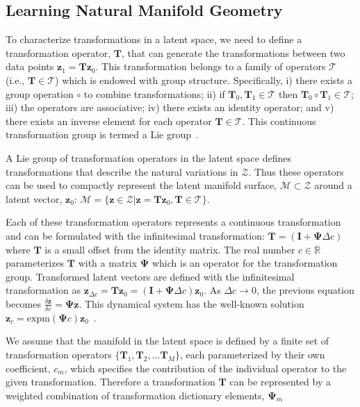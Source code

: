 \documentclass[letterpaper]{article} %
\newcommand{\mtx}[1]{\ensuremath{\mathbf{#1}}}
\newcommand{\vtr}[1]{\ensuremath{\mathbf{#1}}}
\begin{document}
\subsection{Learning Natural Manifold Geometry}\label{sec:lieOpt}
To characterize transformations in a latent space, we need to define a transformation operator, $\mtx{T}$, that can generate the transformations between two data points $\vtr{z}_1 = \mtx{T}\vtr{z}_0$. This transformation belongs to a family of operators $\mathcal{T}$ (i.e., $\mtx{T} \in \mathcal{T}$) which is endowed with group structure. Specifically, i) there exists a group operation $\circ$ to combine transformations; ii) if $\mtx{T}_0, \mtx{T}_1 \in \mathcal{T}$ then $\mtx{T}_0 \circ \mtx{T}_1 \in \mathcal{T}$; iii) the operators are associative; iv) there exists an identity operator; and v) there exists an inverse element for each operator $\mtx{T} \in \mathcal{T}$. This continuous transformation group is termed a Lie group~\cite{boothby1986introduction}. 

A Lie group of transformation operators in the latent space defines transformations that describe the natural variations in $\mathcal{Z}$. Thus these operators can be used to compactly represent the latent manifold surface, $\mathcal{M} \subset \mathcal{Z}$ around a latent vector, $\vtr{z}_0$: $\mathcal{M} = \{\vtr{z} \in \mathcal{Z} | \vtr{z} = \mtx{T}\vtr{z}_0, \mtx{T} \in \mathcal{T}\}$.

Each of these transformation operators represents a continuous transformation and can be formulated with the infinitesimal transformation: $\mtx{T} = (\mtx{I} + \mtx{\Psi}\Delta c)$ where $\mtx{T}$ is a small offset from the identity matrix. The real number $c \in \mathbb{R}$ parameterizes $\mtx{T}$ with a matrix $\mtx{\Psi}$ which is an operator for the transformation group. Transformed latent vectors are defined with the infinitesimal transformation as $\vtr{z}_{\Delta c} = \mtx{T}\vtr{z}_0 = (\mtx{I} + \mtx{\Psi}\Delta c)\vtr{z}_0$. As $\Delta c \rightarrow 0$, the previous equation becomes $\frac{\delta \vtr{z}}{\delta c} = \mtx{\Psi}\vtr{z}$. This dynamical system has the well-known solution $\vtr{z}_c = \mathrm{expm}(\mtx{\Psi} c)\vtr{z}_0$~\cite{rao1999learning,miao2007learning}.

We assume that the manifold in the latent space is defined by a finite set of transformation operators $\{\mtx{T}_1, \mtx{T}_2, ... \mtx{T}_M\}$, each parameterized by their own coefficient, $c_m$, which specifies the contribution of the individual operator to the given transformation. Therefore a transformation $\mtx{T}$ can be represented by a weighted combination of transformation dictionary elements, $\mtx{\Psi}_m$
\end{document}
